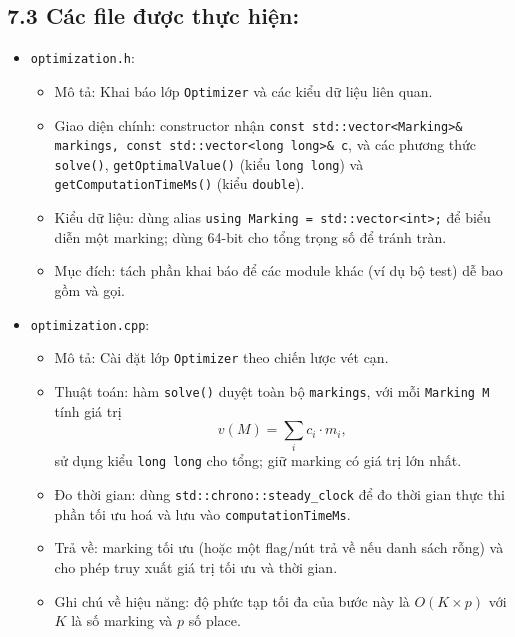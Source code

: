\documentclass[12pt,a4paper]{article}
\begin{document}
\subsection*{7.3 Các file được thực hiện:}


\begin{itemize}
    \item \texttt{optimization.h}:
        \begin{itemize}
            \item Mô tả: Khai báo lớp \texttt{Optimizer} và các kiểu dữ liệu liên quan.
            \item Giao diện chính: constructor nhận \texttt{const std::vector<Marking>\& markings, const std::vector<long long>\& c}, và các phương thức \texttt{solve()}, \texttt{getOptimalValue()} (kiểu \texttt{long long}) và \texttt{getComputationTimeMs()} (kiểu \texttt{double}).
            \item Kiểu dữ liệu: dùng alias \texttt{using Marking = std::vector<int>;} để biểu diễn một marking; dùng 64-bit cho tổng trọng số để tránh tràn.
            \item Mục đích: tách phần khai báo để các module khác (ví dụ bộ test) dễ bao gồm và gọi.
        \end{itemize}

    \item \texttt{optimization.cpp}:
        \begin{itemize}
            \item Mô tả: Cài đặt lớp \texttt{Optimizer} theo chiến lược vét cạn.
            \item Thuật toán: hàm \texttt{solve()} duyệt toàn bộ \texttt{markings}, với mỗi \texttt{Marking M} tính giá trị
            \[ v(M)=\sum_i c_i\cdot m_i, \]
            sử dụng kiểu \texttt{long long} cho tổng; giữ marking có giá trị lớn nhất.
            \item Đo thời gian: dùng \texttt{std::chrono::steady\_clock} để đo thời gian thực thi phần tối ưu hoá và lưu vào \texttt{computationTimeMs}.
            \item Trả về: marking tối ưu (hoặc một flag/nút trả về nếu danh sách rỗng) và cho phép truy xuất giá trị tối ưu và thời gian.
            \item Ghi chú về hiệu năng: độ phức tạp tối đa của bước này là \(O(K\times p)\) với \(K\) là số marking và \(p\) số place.
        \end{itemize}


\end{itemize}
\end{document}
